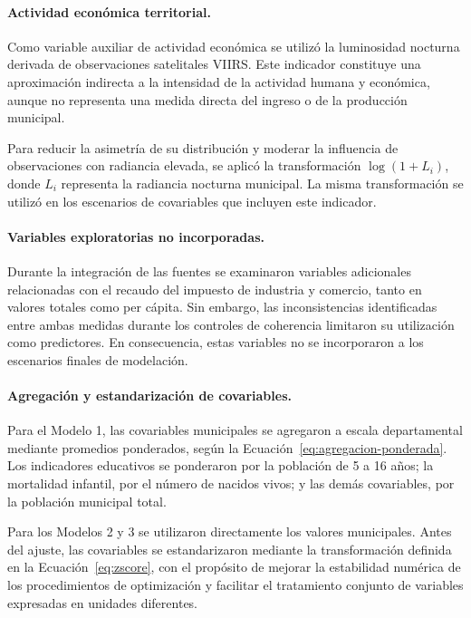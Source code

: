 \paragraph{Actividad económica territorial.}

Como variable auxiliar de actividad económica se utilizó la luminosidad nocturna derivada de observaciones satelitales VIIRS. Este indicador constituye una aproximación indirecta a la intensidad de la actividad humana y económica, aunque no representa una medida directa del ingreso o de la producción municipal.

Para reducir la asimetría de su distribución y moderar la influencia de observaciones con radiancia elevada, se aplicó la transformación $\log(1+L_i)$, donde $L_i$ representa la radiancia nocturna municipal. La misma transformación se utilizó en los escenarios de covariables que incluyen este indicador.

\paragraph{Variables exploratorias no incorporadas.}

Durante la integración de las fuentes se examinaron variables adicionales relacionadas con el recaudo del impuesto de industria y comercio, tanto en valores totales como per cápita. Sin embargo, las inconsistencias identificadas entre ambas medidas durante los controles de coherencia limitaron su utilización como predictores. En consecuencia, estas variables no se incorporaron a los escenarios finales de modelación.

\paragraph{Agregación y estandarización de covariables.}

Para el Modelo 1, las covariables municipales se agregaron a escala departamental mediante promedios ponderados, según la Ecuación~\ref{eq:agregacion-ponderada}. Los indicadores educativos se ponderaron por la población de 5 a 16 años; la mortalidad infantil, por el número de nacidos vivos; y las demás covariables, por la población municipal total.

Para los Modelos 2 y 3 se utilizaron directamente los valores municipales. Antes del ajuste, las covariables se estandarizaron mediante la transformación definida en la Ecuación~\ref{eq:zscore}, con el propósito de mejorar la estabilidad numérica de los procedimientos de optimización y facilitar el tratamiento conjunto de variables expresadas en unidades diferentes.

